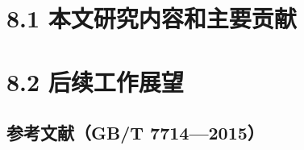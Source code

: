 \documentclass[UTF8]{ctexart}
\begin{document}
\section{\texorpdfstring{8.1 本文研究内容和主要贡献
}{8.1 本文研究内容和主要贡献 }}\label{ux672cux6587ux7814ux7a76ux5185ux5bb9ux548cux4e3bux8981ux8d21ux732e}

\section{\texorpdfstring{8.2 后续工作展望
}{8.2 后续工作展望 }}\label{ux540eux7eedux5de5ux4f5cux5c55ux671b}

\subsection{参考文献（GB/T
7714---2015）}\label{ux53c2ux8003ux6587ux732egbt-77142015}
\end{document}
